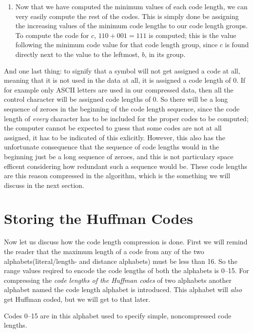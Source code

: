 \begin{enumerate}
  \item Now that we have computed the minimum values of each code
    length, we can very easily compute the rest of the codes. This is
    simply done be assigning the increasing values of the minimum code
    lengths to our code length groups. To compute the code for $c$,
    $110 + 001 = 111$ is computed; this is the value following the
    minimum code value for that code length group, since $c$ is found
    directly next to the value to the leftmost, $b$, in its group.

\end{enumerate}

And one last thing: to signify that a symbol will not get assigned a
code at all, meaning that it is not used in the data at all, it is
assigned a code length of $0$. If for example only ASCII letters are
used in our compressed data, then all the control character will be
assigned code lengths of $0$. So there will be a long sequence of
zeroes in the beginning of the code length sequence, since the code
length of \textit{every} character has to be included for the proper
codes to be computed; the computer cannot be expected to guess that
some codes are not at all assigned, it has to be indicated of this
exlicitly. However, this also has the unfortunate consequence that the
sequence of code lengths would in the beginning just be a long
sequence of zeroes, and this is not particulary space efficent
considering how redundant such a sequence would be. These code lengths
are this reason compressed in the  algorithm, which is the
something we will discuss in the next section.

\section{Storing the Huffman Codes}
\label{sec:storing-huffman-codes}

Now let us discuss how the code length compression is done. First we
will remind the reader that the maximum length of a code from any of
the two alphabets(literal/length- and distance alphabets) must be
less than 16. So the range values reqired to encode the code lengths
of both the alphabets is 0--15. For compressing the \textit{code
  lengths of the Huffman codes} of two alphabets another alphabet
named the code length alphabet is introduced. This alphabet will
\textit{also} get Huffman coded, but we will get to that later.

Codes 0--15 are in this alphabet used to specify simple,
noncompressed code lengths.

